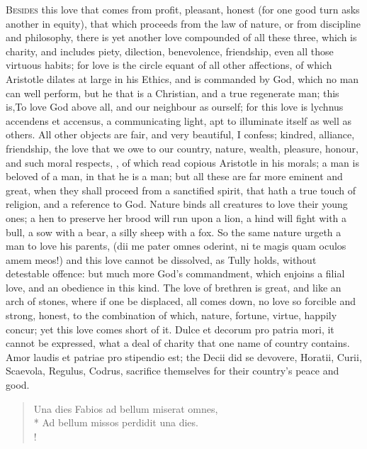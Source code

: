 {\lettrine{B}{esides} this love that comes from profit, pleasant, honest (for one
good turn asks another in equity), that which proceeds from the law of
nature, or from discipline and philosophy, there is yet another love
compounded of all these three, which is charity, and includes piety,
dilection, benevolence, friendship, even all those virtuous habits; for
love is the circle equant of all other affections, of which Aristotle
dilates at large in his Ethics, and is commanded by God, which no man
can well perform, but he that is a Christian, and a true regenerate
man; this is,To love God above all, and our neighbour as ourself;
for this love is lychnus accendens et accensus, a communicating light,
apt to illuminate itself as well as others. All other objects are fair,
and very beautiful, I confess; kindred, alliance, friendship, the love
that we owe to our country, nature, wealth, pleasure, honour, and such
moral respects, \etc{}, of which read copious Aristotle in his
morals; a man is beloved of a man, in that he is a man; but all these
are far more eminent and great, when they shall proceed from a
sanctified spirit, that hath a true touch of religion, and a reference
to God. Nature binds all creatures to love their young ones; a hen to
preserve her brood will run upon a lion, a hind will fight with a bull,
a sow with a bear, a silly sheep with a fox. So the same nature urgeth
a man to love his parents, (dii me pater omnes oderint, ni te
magis quam oculos amem meos!) and this love cannot be dissolved, as
Tully holds, without detestable offence: but much more God's
commandment, which enjoins a filial love, and an obedience in this
kind. The love of brethren is great, and like an arch of stones,
where if one be displaced, all comes down, no love so forcible and
strong, honest, to the combination of which, nature, fortune, virtue,
happily concur; yet this love comes short of it. Dulce et decorum
pro patria mori, it cannot be expressed, what a deal of charity
that one name of country contains. Amor laudis et patriae pro stipendio
est; the Decii did se devovere, Horatii, Curii, Scaevola, Regulus,
Codrus, sacrifice themselves for their country's peace and good.
%
\begin{latin}
\begin{verse}
Una dies Fabios ad bellum miserat omnes,\\*
Ad bellum missos perdidit una dies.\\!

\end{verse}
\end{latin}}
